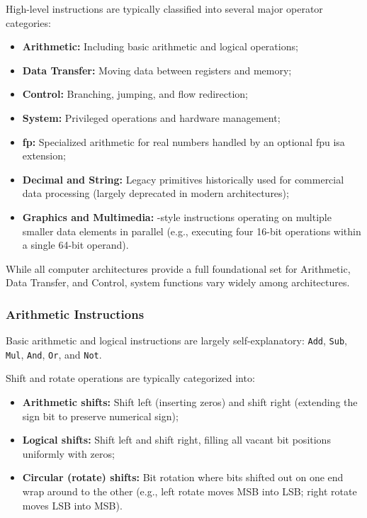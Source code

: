 \noindent High-level instructions are typically classified into several major operator categories:
\begin{itemize}
    \item \textbf{Arithmetic:} Including basic arithmetic and logical operations;
    \item \textbf{Data Transfer:} Moving data between registers and memory;
    \item \textbf{Control:} Branching, jumping, and flow redirection;
    \item \textbf{System:} Privileged operations and hardware management;
    \item \textbf{\gls{fp}:} Specialized arithmetic for real numbers handled by an optional \gls{fpu} \gls{isa} extension;
    \item \textbf{Decimal and String:} Legacy primitives historically used for commercial data processing (largely deprecated in modern architectures);
    \item \textbf{Graphics and Multimedia:} -style instructions operating on multiple smaller data elements in parallel (e.g., executing four 16-bit operations within a single 64-bit operand).
\end{itemize}
While all computer architectures provide a full foundational set for Arithmetic, Data Transfer, and Control, system functions vary widely among architectures.

\subsubsection{Arithmetic Instructions}
Basic arithmetic and logical instructions are largely self-explanatory: \texttt{Add}, \texttt{Sub}, \texttt{Mul}, \texttt{And}, \texttt{Or}, and \texttt{Not}. 

\noindent Shift and rotate operations are typically categorized into:
\begin{itemize}
    \item \textbf{Arithmetic shifts:} Shift left (inserting zeros) and shift right (extending the sign bit to preserve numerical sign);
    \item \textbf{Logical shifts:} Shift left and shift right, filling all vacant bit positions uniformly with zeros;
    \item \textbf{Circular (rotate) shifts:} Bit rotation where bits shifted out on one end wrap around to the other (e.g., left rotate moves MSB into LSB; right rotate moves LSB into MSB).
\end{itemize}

